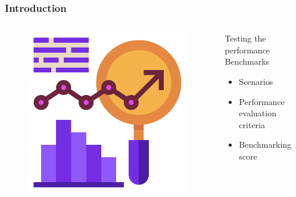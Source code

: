 \begin{frame}
    \frametitle{Introduction}
    \begin{columns}[T]
        \begin{column}{.48\textwidth}
            \begin{figure}[H]
                \includegraphics[width=\textwidth]{images/benchmark.png}
                \label{fig:benchmark}
            \end{figure}
        \end{column}
        \hfill
        \begin{column}{.48\textwidth}
            \begin{block}{Testing the performance}
                 Benchmarks
            \end{block}
            \begin{itemize}
                \item<2-> Scenarios
                \item<3-> Performance evaluation criteria
                \item<4-> Benchmarking score
            \end{itemize}
        \end{column}
    \end{columns}
\end{frame}

